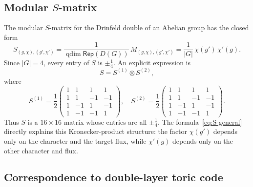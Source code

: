 \documentclass[a4paper,11pt]{article}
\theoremstyle{definition}
\theoremstyle{remark}
\theoremstyle{remark}
\newcommand\Rep {\mathsf{Rep}}
\begin{document}
\subsection*{Modular $S$-matrix}

The modular $S$-matrix for the Drinfeld double of an Abelian group has the closed form
\begin{equation}
    \label{eq:S-general}
    S_{(g,\chi),(g',\chi')} = \frac{1}{\operatorname{qdim} \Rep(D(G))} \, 
    M_{(g,\chi),(g',\chi')} 
    = \frac{1}{|G|} \, \chi(g') \, \chi'(g).
\end{equation}
Since $|G| = 4$, every entry of $S$ is $\pm \tfrac{1}{4}$.  
An explicit expression is
\begin{equation}
    S = S^{(1)} \otimes S^{(2)},
\end{equation}
where
\begin{equation*}
S^{(1)} = \frac{1}{2}
\begin{pmatrix}
1 & 1 & 1 & 1\\
1 & 1 & -1 & -1\\
1 & -1 & 1 & -1\\
1 & -1 & -1 & 1
\end{pmatrix},
\quad 
S^{(2)} = \frac{1}{2}
\begin{pmatrix}
1 & 1 & 1 & 1\\
1 & 1 & -1 & -1\\
1 & -1 & 1 & -1\\
1 & -1 & -1 & 1
\end{pmatrix}.
\end{equation*}
Thus $S$ is a $16\times 16$ matrix whose entries are all $\pm \tfrac{1}{4}$.  
The formula~\eqref{eq:S-general} directly explains this Kronecker-product structure: the factor $\chi(g')$ depends only on the character and the target flux, while $\chi'(g)$ depends only on the other character and flux.


\subsection*{Correspondence to double-layer toric code}
\end{document}
